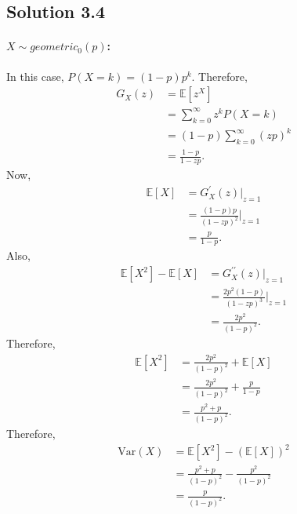 \subsection*{Solution 3.4}
\paragraph{$X \sim geometric_0(p)$:} In this case, $P(X=k) = (1-p)p^k$. Therefore,
\begin{align*}
	G_X(z) &= \mathbb{E}[z^X]\\
	&= \sum_{k=0}^{\infty} z^k P(X=k)\\
	&= (1-p)\sum_{k=0}^{\infty}(zp)^k\\
	&= \frac{1-p}{1-zp}.
\end{align*}
Now,
\begin{align*}
	\mathbb{E}[X] &= G_X^{\prime}(z)|_{z=1}\\
	&= \frac{(1-p)p}{(1-zp)^2}\Big|_{z=1}\\
	&= \frac{p}{1-p}.
\end{align*}
Also,
\begin{align*}
	\mathbb{E}[X^2]-\mathbb{E}[X] &= G_X^{\prime\prime}(z)|_{z=1}\\
	&= \frac{2p^2(1-p)}{(1-zp)^3}\Big|_{z=1}\\
	&= \frac{2p^2}{(1-p)^2}.
\end{align*}
Therefore,
\begin{align*}
	\mathbb{E}[X^2] &= \frac{2p^2}{(1-p)^2} + \mathbb{E}[X]\\
	&= \frac{2p^2}{(1-p)^2} + \frac{p}{1-p}\\
	&= \frac{p^2+p}{(1-p)^2}.
\end{align*}
Therefore,
\begin{align*}
	\text{Var}(X) &= \mathbb{E}[X^2] - (\mathbb{E}[X])^2\\
	&= \frac{p^2+p}{(1-p)^2} - \frac{p^2}{(1-p)^2}\\
	&= \frac{p}{(1-p)^2}.
\end{align*}
